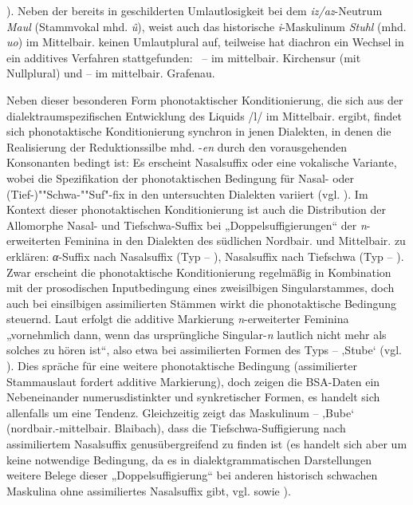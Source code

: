 \citealt[§49c]{Kranzmayer1956}). Neben der bereits in  geschilderten Umlautlosigkeit bei dem \textit{iz/az}{}-Neutrum \textit{Maul} (Stammvokal mhd. \textit{û}), weist auch das historische \textit{i}{}-Maskulinum \textit{Stuhl} (mhd. \textit{uo}) im Mittelbair. keinen Umlautplural auf, teilweise hat diachron ein Wechsel in ein additives Verfahren stattgefunden: \ --  im mittelbair. Kirchensur (mit Nullplural) und  --  im mittelbair. Grafenau.

Neben dieser besonderen Form phonotaktischer Konditionierung, die sich aus der dialektraumspezifischen Entwicklung des Liquids /l/ im Mittelbair. ergibt, findet sich phonotaktische Konditionierung synchron in jenen Dialekten, in denen die Realisierung der Reduktionssilbe mhd. {-\textit{en}} durch den vorausgehenden Konsonanten bedingt ist: Es erscheint Nasalsuffix oder eine vokalische Variante, wobei die Spezifikation der phonotaktischen Bedingung für Nasal- oder (Tief-)""Schwa-""Suf"-fix in den untersuchten Dialekten variiert (vgl. ). Im Kontext dieser phonotaktischen Konditionierung ist auch die Distribution der Allomorphe Nasal- und Tiefschwa-Suffix bei „Doppelsuffigierungen“ der \textit{n}{}-erweiterten Feminina in den Dialekten des südlichen Nordbair. und Mittelbair. zu erklären: \textit{α}{}-Suffix nach Nasalsuffix (Typ  -- ), Nasalsuffix nach Tiefschwa (Typ  -- ). Zwar erscheint die phonotaktische Konditionierung regelmäßig in Kombination mit der prosodischen Inputbedingung eines zweisilbigen Singularstammes, doch auch bei einsilbigen assimilierten Stämmen wirkt die phonotaktische Bedingung steuernd. Laut \citet[117]{Zehetner1985} erfolgt die additive Markierung \textit{n}{}-erweiterter Feminina „vornehmlich dann, wenn das ursprüngliche Singular-\textit{n} lautlich nicht mehr als solches zu hören ist“, also etwa bei assimilierten Formen des Typs \mbox{} --  ‚Stube‘ (vgl. \citealt[180]{Lessiak1963}). Dies spräche für eine weitere phonotaktische Bedingung (assimilierter Stammauslaut fordert additive Markierung), doch zeigen die BSA-Daten ein Nebeneinander numerusdistinkter und synkretischer Formen, es handelt sich allenfalls um eine Tendenz. Gleichzeitig zeigt das Maskulinum  --  ‚Bube‘ (nordbair.-mittelbair. Blaibach), dass die Tiefschwa-Suffigierung nach assimiliertem Nasalsuffix genusübergreifend zu finden ist (es handelt sich aber um keine notwendige Bedingung, da es in dialektgrammatischen Darstellungen weitere Belege dieser „Doppelsuffigierung“ bei anderen historisch schwachen Maskulina ohne assimiliertes Nasalsuffix gibt, vgl. \citealt[138]{Rowley1997} sowie ).

